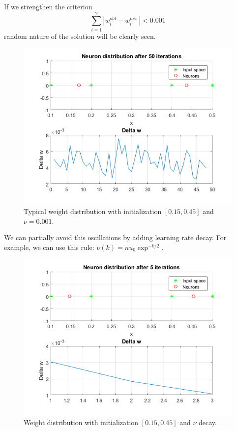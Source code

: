 \documentclass[a4paper, 12pt]{article}
\begin{document}
 \clearpage
 If we strengthen the criterion $$\sum_{i=1}^2|w_i^{old} - w_i^{new}| < 0.001$$ random nature of the solution will be clearly seen.

 \begin{figure}[h]
  \centering
  \caption{Typical weight distribution with initialization $[0.15, 0.45]$ and $\nu = 0.001$.}
  \includegraphics[scale = 0.7]{2}
\end{figure}
We can partially avoid this oscillations by adding learning rate decay. For example, we can use this rule: $\nu(k) = nu_0 \exp^{-k/2}$.
\begin{figure}[h]
  \centering
  \caption{Weight distribution with initialization $[0.15, 0.45]$ and $\nu$ decay.}
  \includegraphics[scale = 0.7]{3}
\end{figure}
\end{document}
